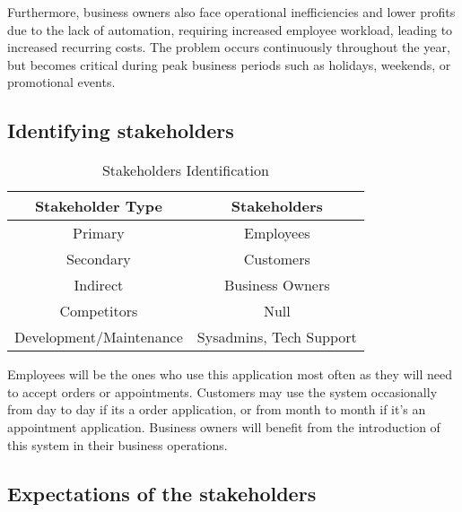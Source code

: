\documentclass[]{VUMIFTemplateClass}
\begin{document}
Furthermore, business owners also face operational inefficiencies and lower
profits due to the lack of automation, requiring increased employee workload,
leading to increased recurring costs. The problem occurs continuously throughout
the year, but becomes critical during peak business periods such as holidays,
weekends, or promotional events.


\subsection{Identifying stakeholders}



\begin{table}[h]
  \centering
  \begin{tabular}{|c|c|}
    \hline
    Stakeholder Type    & Stakeholders \\ \hline
    Primary             & Employees    \\ \hline
    Secondary           & Customers    \\ \hline
    Indirect            & Business Owners \\ \hline
    Competitors         & Null         \\ \hline
    Development/Maintenance & Sysadmins, Tech Support \\ \hline
  \end{tabular}
  \caption{Stakeholders Identification}
  \label{tab:stakeholders}
\end{table}


Employees will be the ones who use this application most often as they will need to accept orders or appointments.
Customers may use the system occasionally from day to day if its a order application, or from month to month if it's an appointment application.
Business owners will benefit from the introduction of this system in their business operations.






\subsection{Expectations of the stakeholders}
\end{document}
